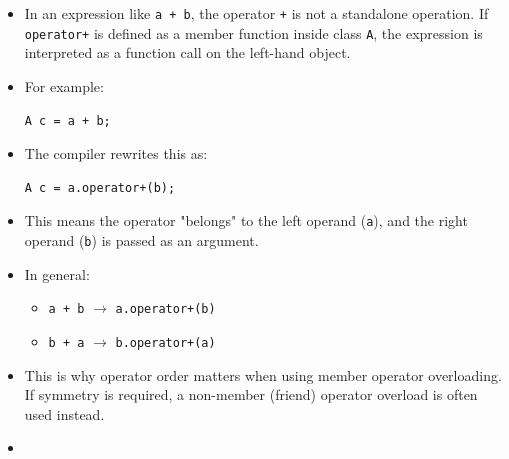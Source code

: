 \documentclass[10pt]{article}
\newcommand{\pbreak}{\vspace{30pt}}
\begin{document}
\begin{itemize}
\begin{verbatim}
int main()
{
    A a(5), b(10);

    A c = choose(true, a, b);
    c.show();   // 5
}
\end{verbatim}


\pbreak 

\item In an expression like \verb|a + b|, the operator \verb|+| is not a standalone operation. If \verb|operator+| is defined as a member function inside class \verb|A|, the expression is interpreted as a function call on the left-hand object.

\item For example:
\begin{verbatim}
A c = a + b;
\end{verbatim}

\item The compiler rewrites this as:
\begin{verbatim}
A c = a.operator+(b);
\end{verbatim}

\item This means the operator "belongs" to the left operand (\verb|a|), and the right operand (\verb|b|) is passed as an argument.

\item In general:
\begin{itemize}
    \item \verb|a + b| $\rightarrow$ \verb|a.operator+(b)|
    \item \verb|b + a| $\rightarrow$ \verb|b.operator+(a)|
\end{itemize}

\item This is why operator order matters when using member operator overloading. If symmetry is required, a non-member (friend) operator overload is often used instead.

\item {}
\end{itemize}


\newpage
\end{document}
